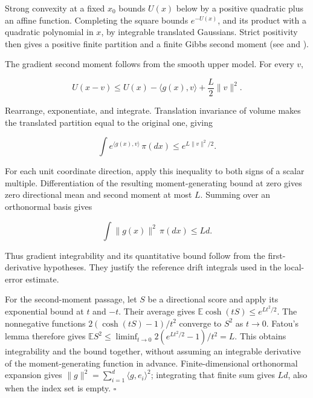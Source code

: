 \documentclass[11pt,a4paper]{article}
\begin{document}
Strong convexity at a fixed \(x_0\) bounds \(U(x)\) below by a positive quadratic plus an affine function. Completing the square bounds \(e^{-U(x)}\), and its product with a quadratic polynomial in \(x\), by integrable translated Gaussians. Strict positivity then gives a positive finite partition and a finite Gibbs second moment (see \cite[Section~3.26.13]{LangevinLean2026ULASC} and \cite[Section~3.26.14]{LangevinLean2026ULASC}).



The gradient second moment follows from the smooth upper model. For every \(v\),

\[U(x-v)\le U(x)-\langle g(x),v\rangle+\frac L2\|v\|^2.\]

Rearrange, exponentiate, and integrate. Translation invariance of volume makes the translated partition equal to the original one, giving

\[\int e^{\langle g(x),v\rangle}\,\pi(dx)\le e^{L\|v\|^2/2}.\]

For each unit coordinate direction, apply this inequality to both signs of a scalar multiple. Differentiation of the resulting moment-generating bound at zero gives zero directional mean and second moment at most \(L\). Summing over an orthonormal basis gives

\[\int\|g(x)\|^2\,\pi(dx)\le Ld.\]

Thus gradient integrability and its quantitative bound follow from the first-derivative hypotheses. They justify the reference drift integrals used in the local-error estimate.




For the second-moment passage, let \(S\) be a directional score and apply its exponential bound at \(t\) and \(-t\). Their average gives \(\mathbb E\cosh(tS)\le e^{Lt^2/2}\). The nonnegative functions \(2(\cosh(tS)-1)/t^2\) converge to \(S^2\) as \(t\to0\). Fatou's lemma therefore gives \(\mathbb ES^2\le\liminf_{t\to0}2(e^{Lt^2/2}-1)/t^2=L\). This obtains integrability and the bound together, without assuming an integrable derivative of the moment-generating function in advance. Finite-dimensional orthonormal expansion gives \(\|g\|^2=\sum_{i=1}^d\langle g,e_i\rangle^2\); integrating that finite sum gives \(Ld\), also when the index set is empty. \(\square\)
\end{document}
